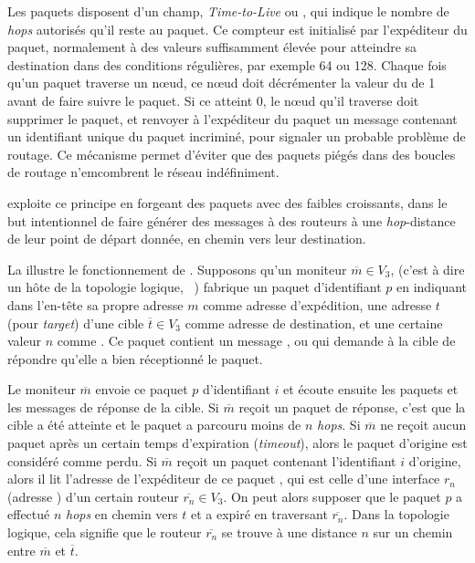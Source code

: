 Les paquets \ip disposent d'un champ, {\em Time-to-Live} ou \ttl, qui indique
le nombre de {\em hops} autorisés qu'il reste au paquet. Ce compteur est
initialisé par l'expéditeur du paquet, normalement à des valeurs suffisamment élevée pour
atteindre sa destination dans des conditions régulières, par exemple 64 ou 128.
Chaque fois qu'un paquet traverse un n\oe{}ud, ce n\oe{}ud doit décrémenter la valeur
du \ttl de 1 avant de faire suivre le paquet. Si ce \ttl atteint 0, le n\oe{}ud
qu'il traverse doit supprimer le paquet, et renvoyer à l'expéditeur du paquet un
message \icmptimeout contenant un identifiant unique du paquet incriminé, pour
signaler un probable problème de routage. Ce mécanisme permet d'éviter que des
paquets piégés dans des boucles de routage n'emcombrent le réseau indéfiniment.

\traceroute exploite ce principe en forgeant des paquets avec des \ttl faibles
croissants, dans le but intentionnel de faire générer des messages \icmptimeout
à des routeurs à une {\em hop}-distance de leur point de départ donnée, en
chemin vers leur destination.

La  illustre le fonctionnement de \traceroute. Supposons
qu'un moniteur ${\overline m} \in V_3$, (c'est à dire un hôte de la topologie
logique, \cf~) fabrique un paquet \ip d'identifiant
$p$ en indiquant dans l'en-tête sa propre adresse $m$ comme adresse
d'expédition, une adresse $t$ (pour {\em target}) d'une cible ${\overline t} \in
V_3$ comme adresse de destination, et une certaine valeur $n$ comme \ttl. Ce
paquet contient un message \icmp, \tcp ou \udp qui demande à la cible de
répondre qu'elle a bien réceptionné le paquet.

Le moniteur ${\overline m}$ envoie ce paquet $p$ d'identifiant $i$ et écoute
ensuite les paquets \icmptimeout et les messages de réponse de la cible. Si
${\overline m}$ reçoit un paquet de réponse, c'est que la cible a été atteinte
et le paquet a parcouru moins de $n$ {\em hops}. Si ${\overline m}$ ne reçoit
aucun paquet après un certain temps d'expiration ({\em timeout}), alors le
paquet d'origine est considéré comme perdu. Si ${\overline m}$ reçoit un paquet
\icmptimeout contenant l'identifiant $i$ d'origine, alors il lit l'adresse de
l'expéditeur de ce paquet \icmp, qui est celle d'une interface $r_n$ (adresse
\ip) d'un certain routeur $\overline{r_n} \in V_3$.
On peut alors supposer que le paquet $p$ a effectué $n$ {\em hops} en chemin
vers $t$ et a expiré en traversant $\overline{r_n}$. Dans la topologie logique,
cela signifie que le routeur $\overline{r_n}$ se trouve à une distance $n$ sur
un chemin entre ${\overline m}$ et ${\overline t}$.

